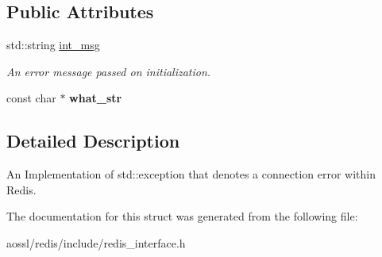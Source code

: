 \subsection*{Public Attributes}
\begin{DoxyCompactItemize}
\item 
std\+::string \hyperlink{structRedisConnectionException_a95af5cf7df2c6dda75b37574a6cafba4}{int\+\_\+msg}\hypertarget{structRedisConnectionException_a95af5cf7df2c6dda75b37574a6cafba4}{}\label{structRedisConnectionException_a95af5cf7df2c6dda75b37574a6cafba4}

\begin{DoxyCompactList}\small\item\em An error message passed on initialization. \end{DoxyCompactList}\item 
const char $\ast$ {\bfseries what\+\_\+str}\hypertarget{structRedisConnectionException_a03dcbe6a8601ce6b37ab180321bd745b}{}\label{structRedisConnectionException_a03dcbe6a8601ce6b37ab180321bd745b}

\end{DoxyCompactItemize}


\subsection{Detailed Description}
An Implementation of std\+::exception that denotes a connection error within Redis. 

The documentation for this struct was generated from the following file\+:\begin{DoxyCompactItemize}
\item 
aossl/redis/include/redis\+\_\+interface.\+h\end{DoxyCompactItemize}
